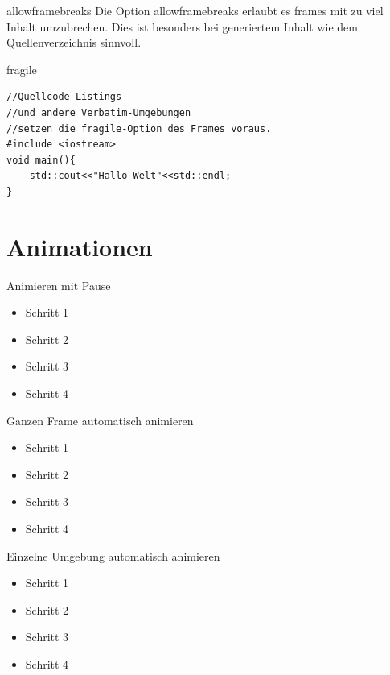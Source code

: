 \documentclass[t,aspectratio=169,dvipsnames]{beamer}
\begin{document}
\begin{frame}[allowframebreaks]{allowframebreaks}
	Die Option allowframebreaks erlaubt es frames mit zu viel Inhalt umzubrechen. Dies ist besonders bei generiertem Inhalt wie dem Quellenverzeichnis sinnvoll.
	\\[1cm]
	\lipsum[1-2]
\end{frame}

\begin{frame}[fragile]{fragile}
\begin{lstlisting}
//Quellcode-Listings
//und andere Verbatim-Umgebungen
//setzen die fragile-Option des Frames voraus.
#include <iostream>
void main(){
	std::cout<<"Hallo Welt"<<std::endl;
}
\end{lstlisting}
\end{frame}

\section{Animationen}

\begin{frame}{Animieren mit Pause}
\begin{itemize}
	\item Schritt 1
	\item Schritt 2
	\pause
	\item Schritt 3
	\item Schritt 4
\end{itemize}
\end{frame}

\begin{frame}[<+->]{Ganzen Frame automatisch animieren}
\begin{itemize}
	\item Schritt 1
	\item Schritt 2
	\item Schritt 3
	\item Schritt 4
\end{itemize}
\end{frame}

\begin{frame}{Einzelne Umgebung automatisch animieren}
\begin{itemize}[<+->]
	\item Schritt 1
	\item Schritt 2
	\item Schritt 3
	\item Schritt 4
\end{itemize}
\end{frame}
\end{document}
